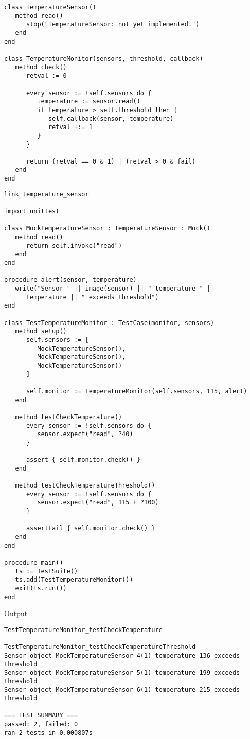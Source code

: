 \documentclass[letterpaper,12pt]{article}
\begin{document}
\bigskip{}
\begin{verbatim}
class TemperatureSensor()
   method read()
      stop("TemperatureSensor: not yet implemented.")
   end
end

class TemperatureMonitor(sensors, threshold, callback)
   method check()
      retval := 0
      
      every sensor := !self.sensors do {
         temperature := sensor.read()
         if temperature > self.threshold then {
            self.callback(sensor, temperature)
            retval +:= 1
         }
      }

      return (retval == 0 & 1) | (retval > 0 & fail)
   end
end
\end{verbatim}

\bigskip{}
\begin{verbatim}
link temperature_sensor

import unittest

class MockTemperatureSensor : TemperatureSensor : Mock()
   method read()
      return self.invoke("read")
   end
end

procedure alert(sensor, temperature)
   write("Sensor " || image(sensor) || " temperature " || 
      temperature || " exceeds threshold")
end

class TestTemperatureMonitor : TestCase(monitor, sensors)
   method setup()
      self.sensors := [
         MockTemperatureSensor(),
         MockTemperatureSensor(),
         MockTemperatureSensor()
      ]

      self.monitor := TemperatureMonitor(self.sensors, 115, alert)
   end

   method testCheckTemperature()
      every sensor := !self.sensors do {
         sensor.expect("read", ?40)
      }

      assert { self.monitor.check() }
   end

   method testCheckTemperatureThreshold()
      every sensor := !self.sensors do {
         sensor.expect("read", 115 + ?100)
      }

      assertFail { self.monitor.check() }
   end
end

procedure main()
   ts := TestSuite()
   ts.add(TestTemperatureMonitor())
   exit(ts.run())
end
\end{verbatim}

\noindent Output
\begin{verbatim}
TestTemperatureMonitor_testCheckTemperature

TestTemperatureMonitor_testCheckTemperatureThreshold
Sensor object MockTemperatureSensor_4(1) temperature 136 exceeds threshold
Sensor object MockTemperatureSensor_5(1) temperature 199 exceeds threshold
Sensor object MockTemperatureSensor_6(1) temperature 215 exceeds threshold

=== TEST SUMMARY ===
passed: 2, failed: 0
ran 2 tests in 0.000807s
\end{verbatim}
\end{document}
